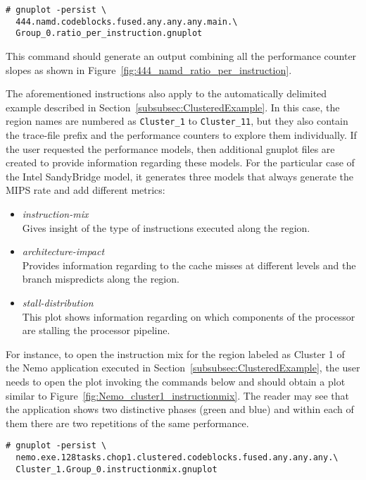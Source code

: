 \begin{verbatim}
# gnuplot -persist \
  444.namd.codeblocks.fused.any.any.any.main.\
  Group_0.ratio_per_instruction.gnuplot
\end{verbatim}

This command should generate an output combining all the performance counter slopes as shown in Figure~\ref{fig:444_namd_ratio_per_instruction}.



The aforementioned instructions also apply to the automatically delimited example described in Section~\ref{subsubsec:ClusteredExample}.
In this case, the region names are numbered as \texttt{Cluster\_1} to \texttt{Cluster\_11}, but they also contain the trace-file prefix and the performance counters to explore them individually.
If the user requested the performance models, then additional gnuplot files are created to provide information regarding these models.
For the particular case of the Intel SandyBridge model, it generates three models that always generate the MIPS rate and add different metrics:

\begin{itemize}
	\item \textit{instruction-mix}\\
	Gives insight of the type of instructions executed along the region.
	\item \textit{architecture-impact}\\
	Provides information regarding to the cache misses at different levels and the branch mispredicts along the region.
	\item \textit{stall-distribution}\\
	This plot shows information regarding on which components of the processor are stalling the processor pipeline.
\end{itemize}

For instance, to open the instruction mix for the region labeled as Cluster 1 of the Nemo application executed in Section~\ref{subsubsec:ClusteredExample}, the user needs to open the plot invoking the commands below and should obtain a plot similar to Figure~\ref{fig:Nemo_cluster1_instructionmix}.
The reader may see that the application shows two distinctive phases (green and blue) and within each of them there are two repetitions of the same performance.

\begin{verbatim}
# gnuplot -persist \
  nemo.exe.128tasks.chop1.clustered.codeblocks.fused.any.any.any.\
  Cluster_1.Group_0.instructionmix.gnuplot
\end{verbatim}

